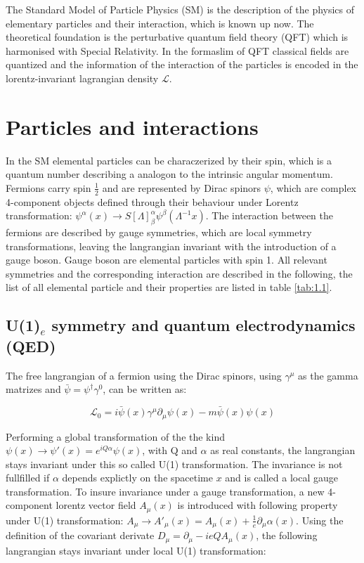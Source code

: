 The Standard Model of Particle Physics (SM) is the description of the physics of elementary particles and their interaction, which is known up now. The theoretical foundation is the perturbative quantum field theory (QFT) which is harmonised with Special Relativity. In the formaslim of QFT classical fields are quantized and the information of the interaction of the particles is encoded in the lorentz-invariant lagrangian density $\mathcal{L}$. 

\section{Particles and interactions}
\label{section_1_1}

In the SM elemental particles can be characzerized by their spin, which is a quantum number describing a analogon to the intrinsic angular momentum. Fermions carry spin $\frac{1}{2}$ and are represented by Dirac spinors $\psi$, which are complex 4-component objects defined through their behaviour under Lorentz transformation: $\psi^{\alpha}(x) \rightarrow S[\Lambda]^{\alpha}_{\beta} \psi^{\beta}(\Lambda^{-1}x)$. The interaction between the fermions are described by gauge symmetries, which are local symmetry transformations, leaving the langrangian invariant with the introduction of a gauge boson. Gauge boson are elemental particles with spin 1. All relevant symmetries and the corresponding interaction are described in the following, the list of all elemental particle and their properties are listed in table \ref{tab:1.1}.

\subsection*{\small U(1)${_e}$ symmetry and quantum electrodynamics (QED)}

The free langrangian of a fermion using the Dirac spinors, using $\gamma^{\mu}$ as the gamma matrizes and $\bar{\psi} = \psi^{\dagger}\gamma^{0}$, can be written as:

\begin{equation}
	\mathcal{L}_{0} =  i\bar{\psi}(x)\gamma^{\mu}\partial_{\mu}\psi(x) - m\bar{\psi}(x)\psi(x)
\end{equation}

Performing a global transformation of the the kind $\psi(x) \rightarrow \psi'(x) = e^{iQ\alpha}\psi(x)$, with Q and $\alpha$ as real constants, the langrangian stays invariant under this so called U(1) transformation. The invariance is not fullfilled if $\alpha$ depends explictly on the spacetime $x$ and is called a local gauge transformation. To insure invariance under a gauge transformation, a new 4-component lorentz vector field $A_{\mu}(x)$ is introduced with following property under U(1) transformation: $A_{\mu} \rightarrow A'_{\mu}(x) = A_{\mu}(x) + \frac{1}{e}\partial_{\mu}\alpha(x)$. Using the definition of the covariant derivate $D_{\mu} = \partial_{\mu} - ieQA_{\mu}(x)$, the following langrangian stays invariant under local U(1) transformation:


